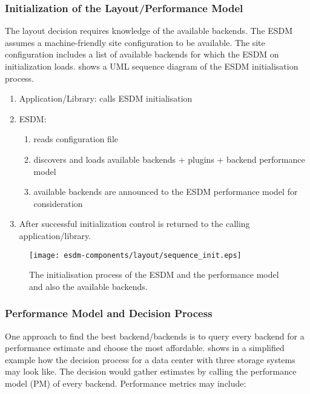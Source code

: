 \subsubsection{Initialization of the Layout/Performance Model}
\label{sec:layout/logical/init}

The layout decision requires knowledge of the available backends.
The ESDM assumes a machine-friendly site configuration to be available.
The site configuration includes a list of available backends for which the ESDM on initialization loads.
 shows a UML sequence diagram of the ESDM initialisation process.

\begin{enumerate}
	\item Application/Library: calls ESDM initialisation
	\item ESDM:
	\begin{enumerate}
		\item reads configuration file
		\item discovers and loads available backends + plugins + backend performance model
		\item available backends are announced to the ESDM performance model for consideration
	\end{enumerate}
	\item After successful initialization control is returned to the calling application/library.
\end{enumerate}

\begin{figure}
	\centering
	\texttt{[image: esdm-components/layout/sequence\_init.eps]}
	\caption{The initialisation process of the ESDM and the performance model and also the available backends.}
	\label{fig:esdm layout initialisation}
\end{figure}



\subsubsection{Performance Model and Decision Process}
\label{sec: layout/logical/decision}

One approach to find the best backend/backends is to query every backend for a performance estimate and choose the most affordable.
 shows in a simplified example how the decision process for a data center with three storage systems may look like.
The decision would gather estimates by calling the performance model (PM) of every backend.
Performance metrics may include:

